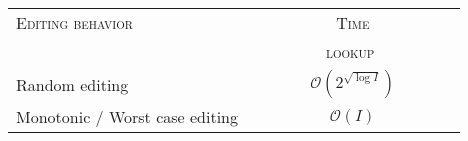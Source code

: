 
\begin{tabularx}{0.6\textwidth}{@{}Xc@{}}
  \toprule
  \textsc{Editing behavior} & \textsc{Time} \\
  & \ \ \ \ \ \ \ \ \ \textsc{lookup} \ \ \ \ \ \ \ \ \ \\ \midrule
  Random editing & $\mathcal{O}(2^{\sqrt{\log I}})$ \\
  Monotonic / Worst case editing & $\mathcal{O}(I)$ \\ \bottomrule
\end{tabularx}

